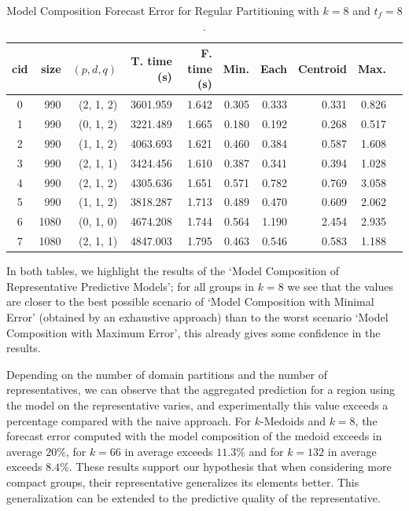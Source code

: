 \begin{table}[h]
	\centering
	\small
	\begin{tabular}{|c|r|r|r|r|r|r|r|r|r|}
		\hline
        cid & size & $(p, d, q)$ & T. time (s) & F. time (s) & Min. & Each & \cellcolor{red!20}Centroid & Max. \\
        \hline
        0 &  990 & (2, 1, 2) &  3601.959 & 1.642 & 0.305 & 0.333 & \cellcolor{red!20}0.331 & 0.826 \\
        1 &  990 & (0, 1, 2) &  3221.489 & 1.665 & 0.180 & 0.192 & \cellcolor{red!20}0.268 & 0.517 \\
        2 &  990 & (1, 1, 2) &  4063.693 & 1.621 & 0.460 & 0.384 & \cellcolor{red!20}0.587 & 1.608 \\
        3 &  990 & (2, 1, 1) &  3424.456 & 1.610 & 0.387 & 0.341 & \cellcolor{red!20}0.394 & 1.028 \\
        4 &  990 & (2, 1, 2) &  4305.636 & 1.651 & 0.571 & 0.782 & \cellcolor{red!20}0.769 & 3.058 \\
        5 &  990 & (1, 1, 2) &  3818.287 & 1.713 & 0.489 & 0.470 & \cellcolor{red!20}0.609 & 2.062 \\
        6 & 1080 & (0, 1, 0) &  4674.208 & 1.744 & 0.564 & 1.190 & \cellcolor{red!20}2.454 & 2.935 \\
        7 & 1080 & (2, 1, 1) &  4847.003 & 1.795 & 0.463 & 0.546 & \cellcolor{red!20}0.583 & 1.188 \\ \hline
	\end{tabular}
	\caption{Model Composition Forecast Error for Regular Partitioning with $k=8$ and $t_{f} =8$.}
	\label{Table:ForecastErrorRegulark10}
\end{table}

In both tables, we highlight the results of the `Model Composition of Representative Predictive Models'; for all groups in $k=8$ we see that the values are closer to the best possible scenario of `Model Composition with Minimal Error' (obtained by an exhaustive approach) than to the worst scenario `Model Composition with Maximum Error', this already gives some confidence in the results. 

Depending on the number of domain partitions and the number of representatives, we can observe that the aggregated prediction for a region using the model on the representative varies, and experimentally this value exceeds a percentage compared with the naive approach. For $k$-Medoids and $k=8$, the forecast error computed with the model composition of the medoid exceeds in average $20\%$, for $k=66$ in average exceeds $11.3\%$ and for $k=132$ in average exceeds $8.4\%$. These results support our hypothesis that when considering more compact groups, their representative generalizes its elements better. This generalization can be extended to the predictive quality of the representative.

